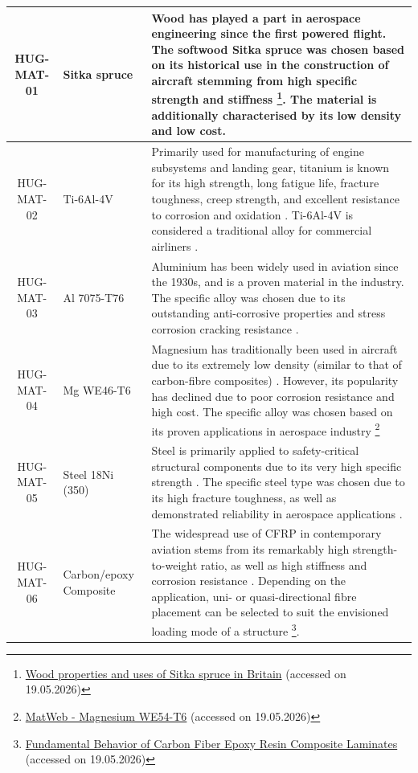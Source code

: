 \begin{longtable}{|c|p{2.25cm}|p{10.75cm}|}
        HUG-MAT-01 & Sitka spruce &  Wood has played a part in aerospace engineering since the first powered flight. The softwood Sitka spruce was chosen based on its historical use in the construction of aircraft stemming from high specific strength and stiffness \footnote{\href{https://www.forestresearch.gov.uk/publications/wood-properties-and-uses-of-sitka-spruce-in-britain/}{Wood properties and uses of Sitka spruce in Britain} (accessed on 19.05.2026)}. The material is additionally characterised by its low density and low cost. \\\hline
        HUG-MAT-02 & Ti-6Al-4V & Primarily used for manufacturing of engine subsystems and landing gear, titanium is known for its high strength, long fatigue life, fracture toughness, creep strength,
        and excellent resistance to corrosion and oxidation \cite{Mouritz2012}. Ti-6Al-4V is considered a traditional alloy for commercial airliners \cite{titanium_use_airbus_boeing}. \\\hline
        HUG-MAT-03 & Al 7075-T76 &  Aluminium has been widely used in aviation since the 1930s, and is a proven material in the industry. The specific alloy was chosen due to its outstanding anti-corrosive properties and stress corrosion cracking resistance \cite{LI2023944}. \\\hline
        HUG-MAT-04 & Mg WE46-T6 & Magnesium has traditionally been used in aircraft due to its extremely low density (similar to that of carbon-fibre composites) \cite{Mouritz2012}. However, its popularity has declined due to poor corrosion resistance and high cost. The specific alloy was chosen based on its proven applications in aerospace industry \footnote{\href{https://www.matweb.com/search/datasheet.aspx?matguid=f41ac8bc1ddd4c1d85247e646b3ec2be}{MatWeb - Magnesium WE54-T6} (accessed on 19.05.2026)}  \\\hline
        HUG-MAT-05 & Steel 18Ni (350)
        & Steel is primarily applied to safety-critical structural components due to its very high specific strength \cite{Mouritz2012}. The specific steel type was chosen due to its high fracture toughness, as well as demonstrated reliability in aerospace applications \cite{ANTOLOVICH1980717}.\\\hline
        HUG-MAT-06 & Carbon/epoxy Composite & The widespread use of CFRP in contemporary aviation stems from its remarkably high strength-to-weight ratio, as well as high stiffness and corrosion resistance \cite{Mouritz2012}. Depending on the application, uni- or quasi-directional fibre placement can be selected to suit the envisioned loading mode of a structure \footnote{\href{https://www.abbottaerospace.com/aa-sb-001/4-materials/4-1-composite-materials/4-1-3-fundamental-behavior-of-carbon-fiber-epoxy-resin-composite-laminates/}{Fundamental Behavior of Carbon Fiber Epoxy Resin Composite Laminates} (accessed on 19.05.2026)}.
        

\end{longtable}
